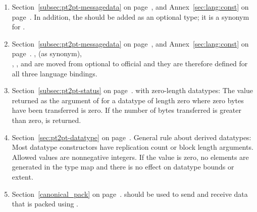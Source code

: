 \begin{enumerate}

\item
Section~\ref{subsec:pt2pt-messagedata} on page~\pageref{subsec:pt2pt-messagedata},
                                       and Annex~\ref{sec:lang:const} on page~\pageref{sec:lang:const}. 
\newline
In addition, the  should be added as an optional
type; it is a synonym for .

\item
Section~\ref{subsec:pt2pt-messagedata} on page~\pageref{subsec:pt2pt-messagedata},
                                       and Annex~\ref{sec:lang:const} on page~\pageref{sec:lang:const}. 
\newline
{},  (as synonym),\\,   
,
and  are moved from optional to official and they are therefore
defined for all three language bindings.

\item
Section~\ref{subsec:pt2pt-status} on page~\pageref{subsec:pt2pt-status}.
\newline
{} with zero-length datatypes:
The value returned as the  argument of
 for a datatype of length zero where zero bytes
have been transferred is zero.  If the number of bytes transferred is
greater than zero,  is returned. 

\item
Section~\ref{sec:pt2pt-datatype} on page~\pageref{sec:pt2pt-datatype}.
\newline
General rule about derived datatypes:
Most datatype constructors have replication count or block length arguments.
Allowed values are 
{nonnegative}
integers. If the value is zero, no elements are
generated in the type map and there is no effect on datatype bounds or
extent. 

\item
Section~\ref{canonical_pack} on page~\pageref{canonical_pack}.
\newline
{} should be used to send and receive data that is packed
using .


\end{enumerate}
